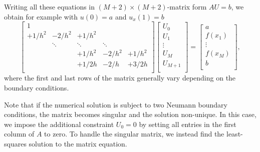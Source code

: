 Writing all these equations in $(M+2) \times (M+2)$-matrix form $AU=b$, we obtain for example with $u(0) = a$ and $u_x(1) = b$
\begin{equation}
\renewcommand{\arraystretch}{1.5} %
\begin{bmatrix}
1 \\
+1/h^2 & -2/h^2 & +1/h^2 &   \\
  & \ddots & \ddots & \ddots & \\
  &   & +1/h^2 & -2/h^2 & +1/h^2 \\
  &   & +1/2h & -2/h & +3/2h \\
\end{bmatrix}
\begin{bmatrix}
U_0 \\ U_1 \\ \vdots \\ U_M \\ U_{M+1} \\
\end{bmatrix}
=
\begin{bmatrix}
a \\ f(x_1) \\ \vdots \\ f(x_M) \\ b \\
\end{bmatrix}
,
\label{matrix_system}
\end{equation}
where the first and last rows of the matrix generally vary depending on the boundary conditions.

Note that if the numerical solution is subject to two Neumann boundary conditions, the matrix becomes singular and the solution non-unique.
In this case, we impose the additional constraint $U_0 = 0$ by setting all entries in the first column of $A$ to zero.
To handle the singular matrix, we instead find the least-squares solution to the matrix equation. \cite{numpy_lstsq}

